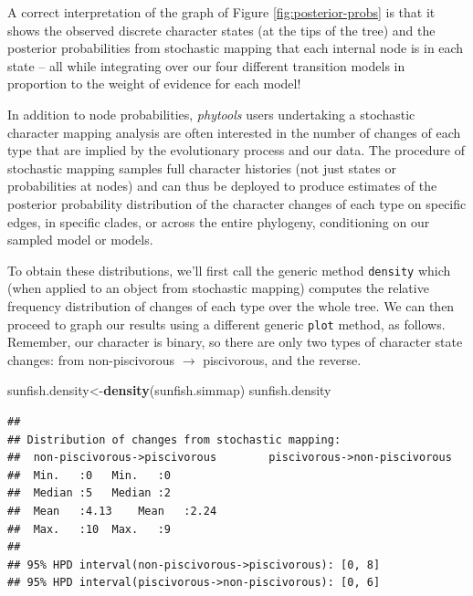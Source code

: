 \documentclass[fleqn,10pt,lineno]{wlpeerj} %
\newenvironment{Shaded}{\begin{snugshade}}{\end{snugshade}}
\newcommand{\FunctionTok}[1]{\textcolor[rgb]{0.13,0.29,0.53}{\textbf{#1}}}
\newcommand{\NormalTok}[1]{#1}
\newcommand{\OtherTok}[1]{\textcolor[rgb]{0.56,0.35,0.01}{#1}}
\begin{document}
A correct interpretation of the graph of Figure \ref{fig:posterior-probs} is that it shows the observed discrete character states (at the tips of the tree) and the posterior probabilities from stochastic mapping that each internal node is in each state -- all while integrating over our four different transition models in proportion to the weight of evidence for each model!

In addition to node probabilities, \emph{phytools} users undertaking a stochastic character mapping analysis are often interested in the number of changes of each type that are implied by the evolutionary process and our data. The procedure of stochastic mapping samples full character histories (not just states or probabilities at nodes) and can thus be deployed to produce estimates of the posterior probability distribution of the character changes of each type on specific edges, in specific clades, or across the entire phylogeny, conditioning on our sampled model or models.

To obtain these distributions, we'll first call the generic method \texttt{density} which (when applied to an object from stochastic mapping) computes the relative frequency distribution of changes of each type over the whole tree. We can then proceed to graph our results using a different generic \texttt{plot} method, as follows. Remember, our character is binary, so there are only two types of character state changes: from non-piscivorous \(\rightarrow\) piscivorous, and the reverse.

\begin{Shaded}
\begin{Highlighting}[]
\NormalTok{sunfish.density}\OtherTok{\textless{}{-}}\FunctionTok{density}\NormalTok{(sunfish.simmap)}
\NormalTok{sunfish.density}
\end{Highlighting}
\end{Shaded}

\begin{verbatim}
## 
## Distribution of changes from stochastic mapping:
##  non-piscivorous->piscivorous        piscivorous->non-piscivorous
##  Min.   :0   Min.   :0
##  Median :5   Median :2
##  Mean   :4.13    Mean   :2.24
##  Max.   :10  Max.   :9
## 
## 95% HPD interval(non-piscivorous->piscivorous): [0, 8]
## 95% HPD interval(piscivorous->non-piscivorous): [0, 6]
\end{verbatim}
\end{document}
